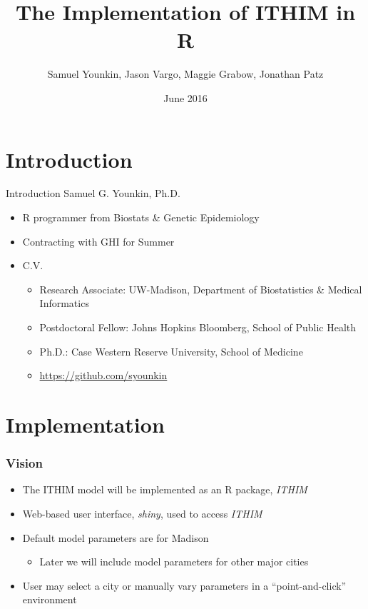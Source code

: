 \documentclass[handout,13pt,compress,c]{beamer}
\title[]{The Implementation of ITHIM in R}
\author[]{\small{Samuel Younkin, Jason Vargo, Maggie Grabow, Jonathan Patz}}
\institute{Global Health Institute\\University of Wisconsin-Madison}
\date{\tiny{June 2016}}
\newcommand{\ft}[1]{\frametitle{#1}}
\newcommand{\bi}{\begin{itemize}}
\newcommand{\ei}{\end{itemize}}
\begin{document}
\frame{\titlepage}
\frame{
   \ft{Outline}
\tableofcontents
}
\section{Introduction}
\begin{frame}{Introduction}
Samuel G. Younkin, Ph.D.
\bi\item R programmer from Biostats \& Genetic Epidemiology
\item Contracting with GHI for Summer
\item C.V.
\bi \item Research Associate: UW-Madison, Department of Biostatistics
\& Medical Informatics
\item Postdoctoral Fellow: Johns Hopkins Bloomberg, School of Public Health
\item Ph.D.: Case Western Reserve University, School of Medicine
\item \url{https://github.com/syounkin}
\ei\ei
\end{frame}
\section{Implementation}
\begin{frame}[fragile]
\frametitle{Vision}
\bi\item The ITHIM model will be implemented as an R package, \textit{ITHIM}
\item Web-based user interface, \textit{shiny}, used to access \textit{ITHIM}
\item Default model parameters are for Madison
\bi\item Later we will include model parameters for other major cities\ei
\item User may select a city or manually vary parameters in a ``point-and-click'' environment
\ei
\end{frame}
\end{document}
